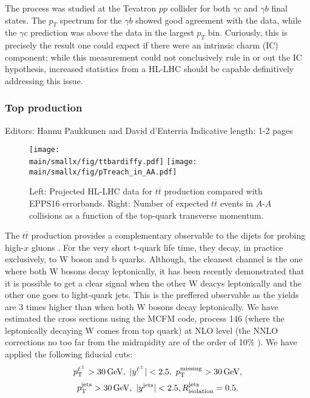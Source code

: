 \documentclass[../report.tex]{subfiles}
\providecommand{\main}{..}
\begin{document}
The process was studied at the Tevatron $pp$ collider 
for both $\gamma c$ and $\gamma b$ final states. 
The $p_T$ spectrum for the $\gamma b$ showed good agreement 
with the data, while the  $\gamma c$ prediction was above the data in the largest $p_T$ bin. 
Curiously, this is precisely the result one could expect  if there were an intrinsic charm (IC)
component; while this measurement could not conclusively rule  in or out  the IC hypothesis, 
increased statistics from a HL-LHC should be capable  definitively addressing this issue. 









\subsubsection{Top production}
\label{sec:top4npdfs}
Editors: Hannu Paukkunen and David d'Enterria
Indicative length: 1-2 pages \\

\begin{figure}[htb!]
\centering
\texttt{[image: \\main/smallx/fig/ttbardiffy.pdf]}
\texttt{[image: \\main/smallx/fig/pTreach\_in\_AA.pdf]}
\caption{Left: Projected HL-LHC data for $t\overline{t}$ production compared with EPPS16 errorbands. Right: Number of expected $t\overline{t}$ events in $A$-$A$ collisions as a function of the top-quark transverse momentum.}
\label{fig:ttbardiffy}
\end{figure}

The $t\overline{t}$ production provides a complementary observable to the dijets for probing high-$x$ gluons \cite{dEnterria:2015mgr}. For the very short t-quark life time, they decay, in practice exclusively, to W boson and b quarks. Although, the cleanest channel is the one where both W bosons decay leptonically, it has been recently demonstrated \cite{Sirunyan:2017xku} that it is possible to get a clear signal when the other W deacys leptonically and the other one goes to light-quark jets. This is the preffered observable as the yields are 3 times higher than when both W bosons decay leptonically. We have estimated the cross sections using the MCFM code, process 146 (where the leptonically decaying W comes from top quark) at NLO level (the NNLO corrections no too far from the midrapidity are of the order of 10\% \cite{}). We have applied the following fiducial cuts:
$$ p_{\rm T}^{\ell^\pm} > 30 \, {\rm GeV}, \ |y^{\ell^\pm}| < 2.5, \ p_{\rm T}^{\rm missing} > 30 \, {\rm GeV}, $$
$$ p_{\rm T}^{\rm jets} > 30 \, {\rm GeV}, \ |y^{\rm jets}| < 2.5, R_{\rm isolation}^{\rm jets} = 0.5. $$
\end{document}
